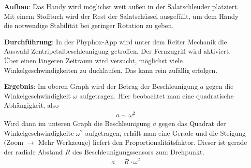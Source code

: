 \documentclass[../main.tex]{subfiles}
\begin{document}
\begin{tcolorbox}
    \vspace{0.7cm}
    \begin{minipage}[]{0.73\textwidth}
        \textbf{Aufbau}: Das Handy wird möglichst weit außen in der Salatschleuder platziert. Mit einem Stofftuch wird der Rest der Salatschüssel ausgefüllt, um dem Handy die notwendige Stabilität bei geringer Rotation zu geben.

        \vspace{0.7cm}
        \textbf{Durchführung}: In der Phyphox-App wird unter dem Reiter \glqq Mechanik\grqq{} die Auswahl \glqq Zentripetalbeschleunigung\grqq{} getroffen. Der Fernzugriff wird aktiviert. Über einen längeren Zeitraum wird versucht, möglichst viele Winkelgeschwindigkeiten zu duchlaufen. Das kann rein zufällig erfolgen.

        \vspace{0.7cm}
        \textbf{Ergebnis}: Im oberen Graph wird der Betrag der Beschleunigung $a$ gegen die Winkelgeschwindigkeit $\omega$ aufgetragen. Hier beobachtet man eine quadratische Abhängigkeit, also
        \begin{align*}
            a \sim \omega^2
        \end{align*}
        Wird dann im unteren Graph die Beschleunigung $a$ gegen das Quadrat der Winkelgeschwindigkeite $\omega^2$ aufgetragen, erhält man eine Gerade und die Steigung (Zoom $\rightarrow$ Mehr Werkzeuge) liefert den Proportionalitätsfaktor. Dieser ist gerade der radiale Abstand $R$ des Beschleunigungssensors zum Drehpunkt. 
        \begin{align*}
            a = R \cdot \omega^2
        \end{align*}
    \end{minipage}
    \hspace{0.2cm}
    \begin{minipage}[]{0.22\textwidth}

\end{minipage}
\end{tcolorbox}
\end{document}
